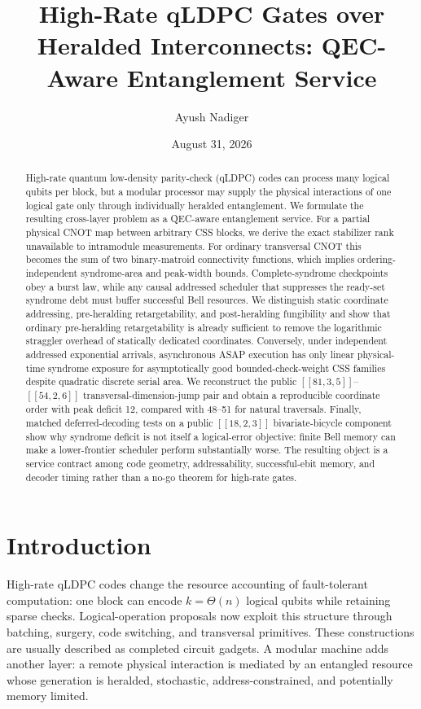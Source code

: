 \documentclass[aps,prx,reprint,superscriptaddress,nofootinbib,longbibliography,floatfix]{revtex4-2}
\begin{document}
\title{High-Rate qLDPC Gates over Heralded Interconnects: QEC-Aware Entanglement Service}
\author{Ayush Nadiger}
\date{August 31, 2026}

\begin{abstract}
High-rate quantum low-density parity-check (qLDPC) codes can process many logical qubits per block, but a modular processor may supply the physical interactions of one logical gate only through individually heralded entanglement. We formulate the resulting cross-layer problem as a QEC-aware entanglement service. For a partial physical CNOT map between arbitrary CSS blocks, we derive the exact stabilizer rank unavailable to intramodule measurements. For ordinary transversal CNOT this becomes the sum of two binary-matroid connectivity functions, which implies ordering-independent syndrome-area and peak-width bounds. Complete-syndrome checkpoints obey a burst law, while any causal addressed scheduler that suppresses the ready-set syndrome debt must buffer successful Bell resources. We distinguish static coordinate addressing, pre-heralding retargetability, and post-heralding fungibility and show that ordinary pre-heralding retargetability is already sufficient to remove the logarithmic straggler overhead of statically dedicated coordinates. Conversely, under independent addressed exponential arrivals, asynchronous ASAP execution has only linear physical-time syndrome exposure for asymptotically good bounded-check-weight CSS families despite quadratic discrete serial area. We reconstruct the public $[[81,3,5]]$--$[[54,2,6]]$ transversal-dimension-jump pair and obtain a reproducible coordinate order with peak deficit 12, compared with 48--51 for natural traversals. Finally, matched deferred-decoding tests on a public $[[18,2,3]]$ bivariate-bicycle component show why syndrome deficit is not itself a logical-error objective: finite Bell memory can make a lower-frontier scheduler perform substantially worse. The resulting object is a service contract among code geometry, addressability, successful-ebit memory, and decoder timing rather than a no-go theorem for high-rate gates.
\end{abstract}
\maketitle

\section{Introduction}
High-rate qLDPC codes change the resource accounting of fault-tolerant computation: one block can encode $k=\Theta(n)$ logical qubits while retaining sparse checks. Logical-operation proposals now exploit this structure through batching, surgery, code switching, and transversal primitives. These constructions are usually described as completed circuit gadgets. A modular machine adds another layer: a remote physical interaction is mediated by an entangled resource whose generation is heralded, stochastic, address-constrained, and potentially memory limited.
\end{document}

